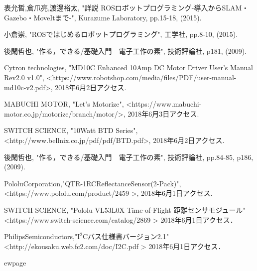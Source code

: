 \documentclass[11pt,a4j]{jarticle}
\begin{document}
\newpage


\newpage

\clearpage

\newpage

\newpage

\newpage

\newpage


\n\begin{thebibliography}{9}
    表允晳,倉爪亮,渡邊裕太, "詳説 ROSロボットプログラミング-導入からSLAM・Gazebo・MoveItまで-", 
    Kurazume Laboratory, pp.15-18, (2015).

    小倉崇, "ROSではじめるロボットプログラミング", 工学社, pp.8-10, (2015).
  
  後閑哲也, "作る，できる/基礎入門　電子工作の素", 技術評論社, p181, (2009).
  
  Cytron technologies, "MD10C Enhanced 10Amp DC Motor Driver User's Manual Rev2.0 v1.0", 
  \textless https://www.robotshop.com/media/files/PDF/user-manual-md10c-v2.pdf\textgreater , 2018年6月2日アクセス.
  
  MABUCHI MOTOR, "Let's Motorize", 
  \textless https://www.mabuchi-motor.co.jp/motorize/branch/motor/\textgreater , 2018年6月3日アクセス.
  
  SWITCH SCIENCE, "10Watt BTD Series", 
  \textless http://www.bellnix.co.jp/pdf/pdf/BTD.pdf\textgreater , 2018年6月2日アクセス.
  
  後閑哲也, "作る，できる/基礎入門　電子工作の素", 技術評論社, pp.84-85, p186, (2009).
  
   Pololu\quad Corporation,\quad "QTR-1RC\quad Reflectance\quad Sensor(2-Pack)",
   \textless https://www.pololu.com/product/2459 \textgreater , 2018年6月1日アクセス.
   
  SWITCH SCIENCE, "Pololu VL53L0X Time-of-Flight 距離センサモジュール"
  \textless https://www.switch-science.com/catalog/2869 \textgreater
  2018年6月1日アクセス．
  
  Philips\quad Semiconductors,\quad "$\mathrm{I^2C}$\hspace{0.5em}バス仕様書バージョン2.1"　　　　　　　　　　
  \textless http://ekousaku.web.fc2.com/doc/I2C.pdf \textgreater
  \quad 2018年6月1日アクセス．
  

\end{thebibliography}ewpage
\end{document}
